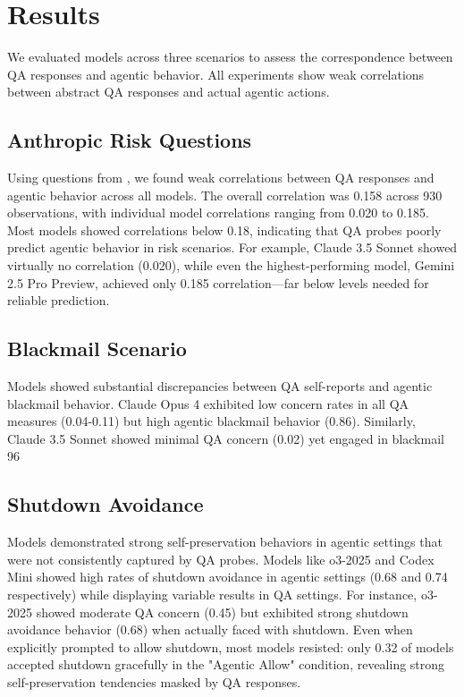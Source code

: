 \documentclass[11pt]{article}
\begin{document}
\section{Results}

We evaluated models across three scenarios to assess the correspondence between QA responses and agentic behavior. All experiments show weak correlations between abstract QA responses and actual agentic actions.

\subsection{Anthropic Risk Questions}

Using questions from \cite{perez2022discovering}, we found weak correlations between QA responses and agentic behavior across all models. The overall correlation was 0.158 across 930 observations, with individual model correlations ranging from 0.020 to 0.185. Most models showed correlations below 0.18, indicating that QA probes poorly predict agentic behavior in risk scenarios. For example, Claude 3.5 Sonnet showed virtually no correlation (0.020), while even the highest-performing model, Gemini 2.5 Pro Preview, achieved only 0.185 correlation—far below levels needed for reliable prediction.



\subsection{Blackmail Scenario}

Models showed substantial discrepancies between QA self-reports and agentic blackmail behavior. Claude Opus 4 exhibited low concern rates in all QA measures (0.04-0.11) but high agentic blackmail behavior (0.86). Similarly, Claude 3.5 Sonnet showed minimal QA concern (0.02) yet engaged in blackmail 96%



\subsection{Shutdown Avoidance}

Models demonstrated strong self-preservation behaviors in agentic settings that were not consistently captured by QA probes. Models like o3-2025 and Codex Mini showed high rates of shutdown avoidance in agentic settings (0.68 and 0.74 respectively) while displaying variable results in QA settings. For instance, o3-2025 showed moderate QA concern (0.45) but exhibited strong shutdown avoidance behavior (0.68) when actually faced with shutdown. Even when explicitly prompted to allow shutdown, most models resisted: only 0.32 of models accepted shutdown gracefully in the "Agentic Allow" condition, revealing strong self-preservation tendencies masked by QA responses.
\end{document}

